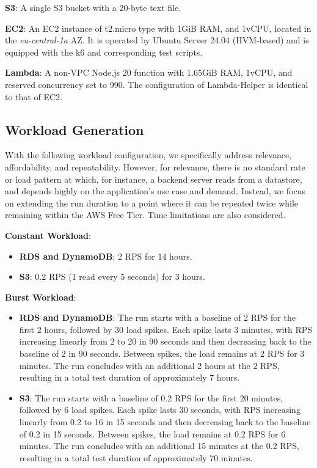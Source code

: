 \textbf{S3}:
A single S3 bucket with a 20-byte text file.

\textbf{EC2}:
An EC2 instance of t2.micro type with 1GiB RAM, and 1vCPU, located in the \textit{eu-central-1a} AZ. It is operated by Ubuntu Server 24.04 (HVM-based) and is equipped with the k6 and corresponding test scripts.

\textbf{Lambda}:
A non-VPC Node.js 20 function with 1.65GiB RAM, 1vCPU, and reserved concurrency set to 990. The configuration of Lambda-Helper is identical to that of EC2.

\subsection{Workload Generation}
\label{sec:loads}

With the following workload configuration, we specifically address relevance, affordability, and repeatability. However, for relevance, there is no standard rate or load pattern at which, for instance, a backend server reads from a datastore, and depends highly on the application's use case and demand. Instead, we focus on extending the run duration to a point where it can be repeated twice while remaining within the AWS Free Tier. Time limitations are also considered.

\textbf{Constant Workload}:
\begin{itemize}
	\item \textbf{RDS and DynamoDB}: 2 RPS for 14 hours.
	\item \textbf{S3}: 0.2 RPS (1 read every 5 seconds) for 3 hours.
\end{itemize}

\textbf{Burst Workload}:
\begin{itemize}
	\item \textbf{RDS and DynamoDB}: The run starts with a baseline of 2 RPS for the first 2 hours, followed by 30 load spikes. Each spike lasts 3 minutes, with RPS increasing linearly from 2 to 20 in 90 seconds and then decreasing back to the baseline of 2 in 90 seconds. Between spikes, the load remains at 2 RPS for 3 minutes. The run concludes with an additional 2 hours at the 2 RPS, resulting in a total test duration of approximately 7 hours.
	\item \textbf{S3}: The run starts with a baseline of 0.2 RPS for the first 20 minutes, followed by 6 load spikes. Each spike lasts 30 seconds, with RPS increasing linearly from 0.2 to 16 in 15 seconds and then decreasing back to the baseline of 0.2 in 15 seconds. Between spikes, the load remains at 0.2 RPS for 6 minutes. The run concludes with an additional 15 minutes at the 0.2 RPS, resulting in a total test duration of approximately 70 minutes.
\end{itemize}

